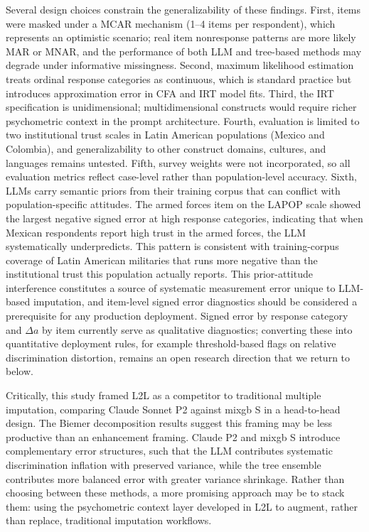 \documentclass[
  man,
  floatsintext,
  longtable,
  nolmodern,
  notxfonts,
  notimes,
  colorlinks=true,linkcolor=blue,citecolor=blue,urlcolor=blue]{apa7}
\begin{document}
Several design choices constrain the generalizability of these findings.
First, items were masked under a MCAR mechanism (1--4 items per
respondent), which represents an optimistic scenario; real item
nonresponse patterns are more likely MAR or MNAR, and the performance of
both LLM and tree-based methods may degrade under informative
missingness. Second, maximum likelihood estimation treats ordinal
response categories as continuous, which is standard practice but
introduces approximation error in CFA and IRT model fits. Third, the IRT
specification is unidimensional; multidimensional constructs would
require richer psychometric context in the prompt architecture. Fourth,
evaluation is limited to two institutional trust scales in Latin
American populations (Mexico and Colombia), and generalizability to
other construct domains, cultures, and languages remains untested.
Fifth, survey weights were not incorporated, so all evaluation metrics
reflect case-level rather than population-level accuracy. Sixth, LLMs
carry semantic priors from their training corpus that can conflict with
population-specific attitudes. The armed forces item on the LAPOP scale
showed the largest negative signed error at high response categories,
indicating that when Mexican respondents report high trust in the armed
forces, the LLM systematically underpredicts. This pattern is consistent
with training-corpus coverage of Latin American militaries that runs
more negative than the institutional trust this population actually
reports. This prior-attitude interference constitutes a source of
systematic measurement error unique to LLM-based imputation, and
item-level signed error diagnostics should be considered a prerequisite
for any production deployment. Signed error by response category and
\(\Delta a\) by item currently serve as qualitative diagnostics;
converting these into quantitative deployment rules, for example
threshold-based flags on relative discrimination distortion, remains an
open research direction that we return to below.

Critically, this study framed L2L as a competitor to traditional
multiple imputation, comparing Claude Sonnet P2 against mixgb S in a
head-to-head design. The Biemer decomposition results suggest this
framing may be less productive than an enhancement framing. Claude P2
and mixgb S introduce complementary error structures, such that the LLM
contributes systematic discrimination inflation with preserved variance,
while the tree ensemble contributes more balanced error with greater
variance shrinkage. Rather than choosing between these methods, a more
promising approach may be to stack them: using the psychometric context
layer developed in L2L to augment, rather than replace, traditional
imputation workflows.
\end{document}
